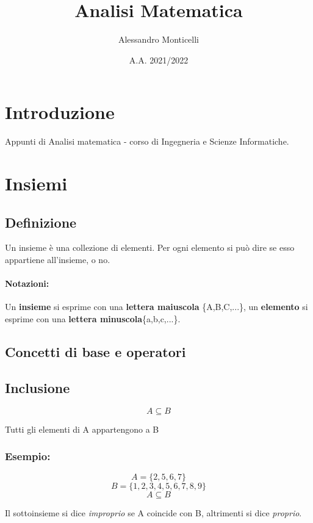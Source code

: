\documentclass{article}
\title{Analisi Matematica}
\author{Alessandro Monticelli}
\date{A.A. 2021/2022}
\begin{document}
  
\maketitle
\newpage
\tableofcontents
\newpage
\section*{Introduzione}
    Appunti di Analisi matematica - corso di Ingegneria e Scienze Informatiche.
\newpage
\section{Insiemi}

\subsection{Definizione}
    Un insieme è una collezione di elementi. Per ogni elemento si può dire se esso appartiene all'insieme, o no.

\paragraph{Notazioni:}Un \textbf{insieme} si esprime con una \textbf{lettera maiuscola} \{A,B,C,...\}, un \textbf{elemento} si esprime con una \textbf{lettera minuscola}\{a,b,c,...\}.

\subsection{Concetti di base e operatori}
\subsection{Inclusione}
    \begin{LARGE}
        \begin{equation*}
            A \subseteq B
        \end{equation*}
    \end{LARGE}
    Tutti gli elementi di A appartengono a B\newline
    
    \subsubsection*{Esempio:}
    
    \begin{LARGE}
        \begin{equation*}
            A = \{2,5,6,7\}
        \end{equation*}
        \begin{equation*}
            B = \{1,2,3,4,5,6,7,8,9\}
        \end{equation*}
        \begin{equation*}
            A \subseteq B
        \end{equation*}
    \end{LARGE}
    Il sottoinsieme si dice \textit{improprio} se A coincide con B, altrimenti si dice \textit{proprio}.
\end{document}
